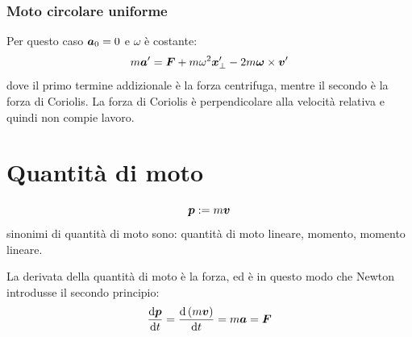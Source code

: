 \subsubsection{Moto circolare uniforme}
Per questo caso $\boldsymbol{a}_0=0$ e $\omega$ è costante:
\begin{equation}
  m\boldsymbol{a}' = \boldsymbol{F} + m\omega^2\boldsymbol{x}'_\perp - 2m\boldsymbol{\omega} \times\boldsymbol{v}'
\end{equation}
dove il primo termine addizionale è la forza centrifuga, mentre il secondo è la forza di Coriolis. La forza di Coriolis è perpendicolare alla velocità relativa e quindi non compie lavoro.

\section{Quantità di moto}
\begin{Def}
  \begin{equation}
    \boldsymbol{p}:=m\boldsymbol{v}
  \end{equation}
  sinonimi di quantità di moto sono: quantità di moto lineare, momento, momento lineare.
\end{Def}
La derivata della quantità di moto è la forza, ed è in questo modo che Newton introdusse il secondo principio:
\begin{equation}
\frac{\mathrm{d} \boldsymbol{p}}{\mathrm{d} t}=\frac{\mathrm{d}\left(m\boldsymbol{v}\right)}{\mathrm{d} t}=m\boldsymbol{a}=\boldsymbol{F}
\end{equation}
